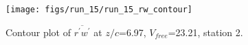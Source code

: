 \begin{figure}[H]
\centering
\texttt{[image: figs/run\_15/run\_15\_rw\_contour]}
\caption{Contour plot of $\overline{r^\prime w^\prime}$ at $z/c$=6.97, $V_{free}$=23.21, station 2.}
\label{fig:run_15_rw_contour}
\end{figure}


